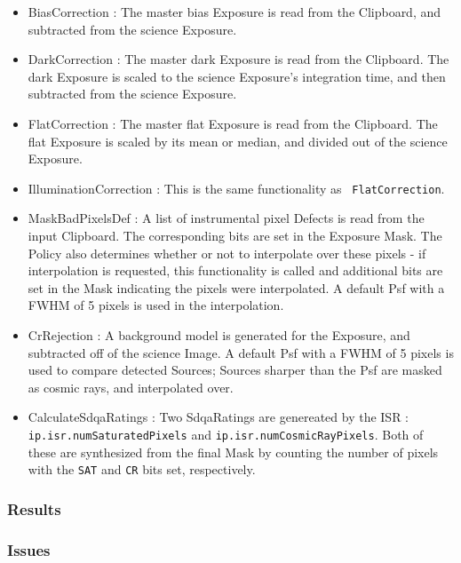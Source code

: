 \begin{itemize}
\item BiasCorrection : The master bias Exposure is read from the
Clipboard, and subtracted from the science Exposure.

\item DarkCorrection : The master dark Exposure is read from the
Clipboard.  The dark Exposure is scaled to the science Exposure's
integration time, and then subtracted from the science Exposure.

\item FlatCorrection : The master flat Exposure is read from the
Clipboard.  The flat Exposure is scaled by its mean or median, and
divided out of the science Exposure.

\item IlluminationCorrection : This is the same functionality as {\tt
FlatCorrection}.  

\item MaskBadPixelsDef : A list of instrumental pixel Defects is read 
from the input Clipboard.  The corresponding bits are set in the
Exposure Mask.  The Policy also determines whether or not to
interpolate over these pixels - if interpolation is requested, this
functionality is called and additional bits are set in the Mask
indicating the pixels were interpolated.  A default Psf with a FWHM of
5 pixels is used in the interpolation.

\item CrRejection : A background model is generated for the Exposure, 
and subtracted off of the science Image.  A default Psf with a FWHM of
5 pixels is used to compare detected Sources; Sources sharper than the
Psf are masked as cosmic rays, and interpolated over.

\item CalculateSdqaRatings : Two SdqaRatings are genereated by the ISR : 
{\tt ip.isr.numSaturatedPixels} and {\tt ip.isr.numCosmicRayPixels}.
Both of these are synthesized from the final Mask by counting the
number of pixels with the {\tt SAT} and {\tt CR} bits set,
respectively.


\end{itemize}


\subsubsection{Results}

\subsubsection{Issues}

